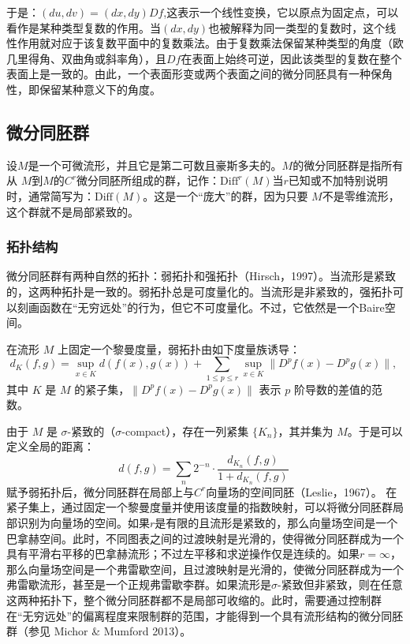 于是：$(du, dv) = (dx, dy) Df$,这表示一个线性变换，它以原点为固定点，可以看作是某种类型复数的作用。当$(dx, dy)$也被解释为同一类型的复数时，这个线性作用就对应于该复数平面中的复数乘法。由于复数乘法保留某种类型的角度（欧几里得角、双曲角或斜率角），且$Df$在表面上始终可逆，因此该类型的复数在整个表面上是一致的。由此，一个表面形变或两个表面之间的微分同胚具有一种保角性，即保留某种意义下的角度。
\subsection{微分同胚群}
设$M$是一个可微流形，并且它是第二可数且豪斯多夫的。$M$的微分同胚群是指所有从 $M$到$M$的$C^r$微分同胚所组成的群，记作：$\text{Diff}^r(M)$当$r$已知或不加特别说明时，通常简写为：$\text{Diff}(M)$。这是一个“庞大”的群，因为只要 $M$不是零维流形，这个群就不是局部紧致的。
\subsubsection{拓扑结构}
微分同胚群有两种自然的拓扑：弱拓扑和强拓扑（Hirsch，1997）。当流形是紧致的，这两种拓扑是一致的。弱拓扑总是可度量化的。当流形是非紧致的，强拓扑可以刻画函数在“无穷远处”的行为，但它不可度量化。不过，它依然是一个Baire空间。

在流形 $M$ 上固定一个黎曼度量，弱拓扑由如下度量族诱导：
$$
d_K(f,g) = \sup_{x \in K} d(f(x), g(x)) + 
\sum_{1 \le p \le r} \sup_{x \in K} \|D^p f(x) - D^p g(x)\|,~
$$
其中 $K$ 是 $M$ 的紧子集，$\|D^p f(x) - D^p g(x)\|$ 表示 $p$ 阶导数的差值的范数。

由于 $M$ 是 $\sigma$-紧致的（$\sigma$-compact），存在一列紧集 $\{K_n\}$，其并集为 $M$。于是可以定义全局的距离：
$$
d(f,g) = \sum_n 2^{-n} \cdot 
\frac{d_{K_n}(f,g)}{1 + d_{K_n}(f,g)}~
$$
赋予弱拓扑后，微分同胚群在局部上与$C^r$向量场的空间同胚（Leslie，1967）。
在紧子集上，通过固定一个黎曼度量并使用该度量的指数映射，可以将微分同胚群局部识别为向量场的空间。如果$r$是有限的且流形是紧致的，那么向量场空间是一个巴拿赫空间。此时，不同图表之间的过渡映射是光滑的，使得微分同胚群成为一个具有平滑右平移的巴拿赫流形；不过左平移和求逆操作仅是连续的。如果$r = \infty$，那么向量场空间是一个弗雷歇空间，且过渡映射是光滑的，使微分同胚群成为一个弗雷歇流形，甚至是一个正规弗雷歇李群。如果流形是$\sigma$-紧致但非紧致，则在任意这两种拓扑下，整个微分同胚群都不是局部可收缩的。此时，需要通过控制群在“无穷远处”的偏离程度来限制群的范围，才能得到一个具有流形结构的微分同胚群（参见 Michor & Mumford 2013）。

